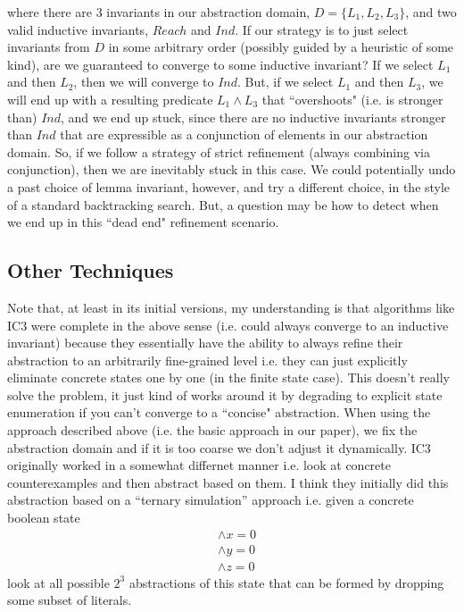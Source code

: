\documentclass[10pt]{article}
\begin{document}
where there are 3 invariants in our abstraction domain, $D=\{L_1, L_2, L_3\}$, and two valid inductive invariants, $Reach$ and $Ind$. If our strategy is to just select invariants from $D$ in some arbitrary order (possibly guided by a heuristic of some kind), are we guaranteed to converge to some inductive invariant? If we select $L_1$ and then $L_2$, then we will converge to $Ind$. But, if we select $L_1$ and then $L_3$, we will end up with a resulting predicate $L_1 \wedge L_3$ that ``overshoots" (i.e. is stronger than) $Ind$, and we end up stuck, since there are no inductive invariants stronger than $Ind$ that are expressible as a conjunction of elements in our abstraction domain. So, if we follow a strategy of strict refinement (always combining via conjunction), then we are inevitably stuck in this case. We could potentially undo a past choice of lemma invariant, however, and try a different choice, in the style of a standard backtracking search. But, a question may be how to detect when we end up in this ``dead end" refinement scenario.

\subsection*{Other Techniques}

Note that, at least in its initial versions, my understanding is that algorithms like IC3 were complete in the above sense (i.e. could always converge to an inductive invariant) because they essentially have the ability to always refine their abstraction to an arbitrarily fine-grained level i.e. they can just explicitly eliminate concrete states one by one (in the finite state case). This doesn't really solve the problem, it just kind of works around it by degrading to explicit state enumeration if you can't converge to a ``concise" abstraction. When using the approach described above (i.e. the basic approach in our paper), we fix the abstraction domain and if it is too coarse we don't adjust it dynamically. IC3 originally worked in a somewhat differnet manner i.e. look at concrete counterexamples and then abstract based on them. I think they initially did this abstraction based on a ``ternary simulation'' approach i.e. given a concrete boolean state 
\begin{align*}
    &\wedge x = 0 \\ 
    &\wedge y = 0 \\ 
    &\wedge z = 0
\end{align*}
look at all possible $2^3$ abstractions of this state that can be formed by dropping some subset of literals.
\end{document}
